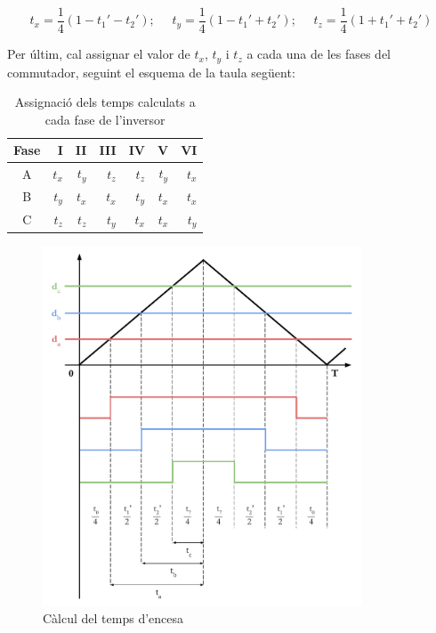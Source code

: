 {{        \begin{equation}
            t_x = \frac{1}{4}(1-t_1'-t_2');\ \ \ \ \ \
            t_y = \frac{1}{4}(1-t_1'+t_2');\ \ \ \ \ \
            t_z = \frac{1}{4}(1+t_1'+t_2')
        \end{equation}

        Per últim, cal assignar el valor de $t_x$, $t_y$ i $t_z$ a cada una de
        les fases del commutador, seguint el esquema de la taula següent:

        \begin{table}[!htb]
            \caption{Assignació dels temps calculats a cada fase de l'inversor}
            \centering
            
            \begin{tabular}{c r r r r r r}
                \toprule
                    {Fase} & I & II & III & IV & V & VI \\
                \midrule
                    A & $t_x$ & $t_y$ & $t_z$ & $t_z$ & $t_y$ & $t_x$ \\
                    B & $t_y$ & $t_x$ & $t_x$ & $t_y$ & $t_x$ & $t_x$ \\ 
                    C & $t_z$ & $t_z$ & $t_y$ & $t_x$ & $t_x$ & $t_y$ \\ 
                \bottomrule
            \end{tabular}
        \end{table}

        \begin{figure}[!htb]
            \centering
            \captionsetup{justification=centering}
            \includegraphics[width=9.5cm]
                { ../img/3_control_motor/encesa.pdf }
            \caption{ Càlcul del temps d'encesa }
            \label{encesa}   
        \end{figure}  

}}
